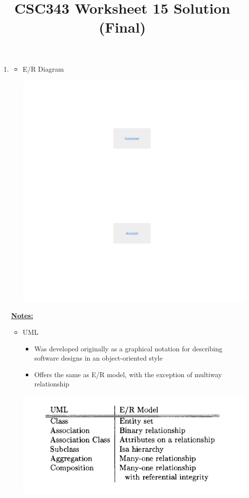 \documentclass[12pt]{article}
\begin{document}
\title{CSC343 Worksheet 15 Solution (Final)}
\maketitle

\begin{enumerate}[1.]
    \item

    \begin{itemize}
        \item E/R Diagram

        \begin{center}
        \includegraphics[width=0.7\linewidth]{images/worksheet_15_solution_9.png}
        \end{center}

    \end{itemize}

    \bigskip

    \underline{\textbf{Notes:}}

    \bigskip

    \begin{itemize}
        \item UML
        \begin{itemize}
            \item Was developed originally as a graphical notation for describing software designs in an object-oriented style
            \item Offers the same as E/R model, with the exception of multiway relationship
        \end{itemize}

        \begin{center}
        \includegraphics[width=0.7\linewidth]{images/worksheet_15_solution_1.png}
        \end{center}


\end{itemize}
\end{enumerate}
\end{document}
